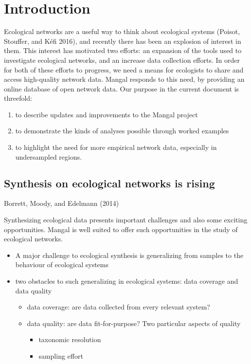 \hypertarget{introduction}{%
\section{Introduction}\label{introduction}}

Ecological networks are a useful way to think about ecological systems
(Poisot, Stouffer, and Kéfi 2016), and recently there has been an
explosion of interest in them. This interest has motivated two efforts:
an expansion of the tools used to investigate ecological networks, and
an increase data collection efforts. In order for both of these efforts
to progress, we need a means for ecologists to share and access
high-quality network data. Mangal responds to this need, by providing an
online database of open network data. Our purpose in the current
document is threefold:

\begin{enumerate}
\def\labelenumi{\arabic{enumi}.}
\tightlist
\item
  to describe updates and improvements to the Mangal project
\item
  to demonstrate the kinds of analyses possible through worked examples
\item
  to highlight the need for more empirical network data, especially in
  undersampled regions.
\end{enumerate}

\hypertarget{synthesis-on-ecological-networks-is-rising}{%
\subsection{Synthesis on ecological networks is
rising}\label{synthesis-on-ecological-networks-is-rising}}

Borrett, Moody, and Edelmann (2014)

Synthesizing ecological data presents important challenges and also some
exciting opportunities. Mangal is well suited to offer such
opportunities in the study of ecological networks.

\begin{itemize}
\tightlist
\item
  A major challenge to ecological synthesis is generalizing from samples
  to the behaviour of ecological systems
\item
  two obstacles to such generalizing in ecological systems: data
  coverage and data quality

  \begin{itemize}
  \tightlist
  \item
    data coverage: are data collected from every relevant system?
  \item
    data quality: are data fit-for-purpose? Two particular aspects of
    quality

    \begin{itemize}
    \tightlist
    \item
      taxonomic resolution
    \item
      sampling effort
    \end{itemize}
  \end{itemize}
\end{itemize}

